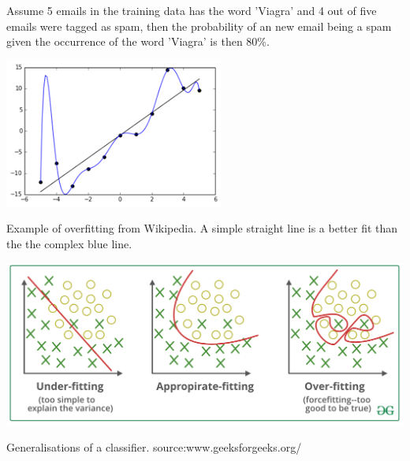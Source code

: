 \documentclass{tufte-handout}
\begin{document}
Assume 5 emails in the training data has the word 'Viagra' and 4 out of five emails were tagged as spam, then the probability of an new email being a spam given the occurrence of the word 'Viagra' is then 80\%.






\begin{marginfigure}%
  \includegraphics[width=\linewidth]{overfitting.png}
  \caption{Example of overfitting from Wikipedia. A simple straight line is a better fit than the the complex blue line. }
  \label{fig:marginfig}
\end{marginfigure}


\begin{marginfigure}%
  \includegraphics[width=\linewidth]{fitting.png}
  \caption{Generalisations of a classifier. source:www.geeksforgeeks.org/}
  \label{fig:marginfig}
\end{marginfigure}
\end{document}
